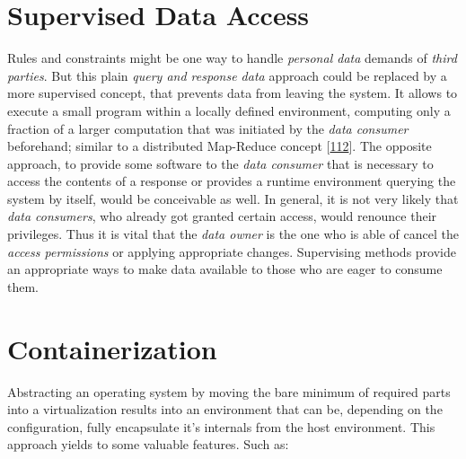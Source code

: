 \documentclass[12pt,english,a4paper,titlepage,cleardoublepage=empty,dottedtoc]{report}
\begin{document}
\section{Supervised Data Access}\label{supervised-data-access}

Rules and constraints might be one way to handle \emph{personal data}
demands of \emph{third parties}. But this plain \emph{query and response
data} approach could be replaced by a more supervised concept, that
prevents data from leaving the system. It allows to execute a small
program within a locally defined environment, computing only a fraction
of a larger computation that was initiated by the \emph{data consumer}
beforehand; similar to a distributed Map-Reduce concept
{[}\protect\hyperlink{ref-paper_2004_distributed-mapreduce}{112}{]}. The
opposite approach, to provide some software to the \emph{data consumer}
that is necessary to access the contents of a response or provides a
runtime environment querying the system by itself, would be conceivable
as well. In general, it is not very likely that \emph{data consumers},
who already got granted certain access, would renounce their privileges.
Thus it is vital that the \emph{data owner} is the one who is able of
cancel the \emph{access permissions} or applying appropriate changes.
Supervising methods provide an appropriate ways to make data available
to those who are eager to consume them.

\section{Containerization}\label{containerization}

Abstracting an operating system by moving the bare minimum of required
parts into a virtualization results into an environment that can be,
depending on the configuration, fully encapsulate it's internals from
the host environment. This approach yields to some valuable features.
Such as:
\end{document}
